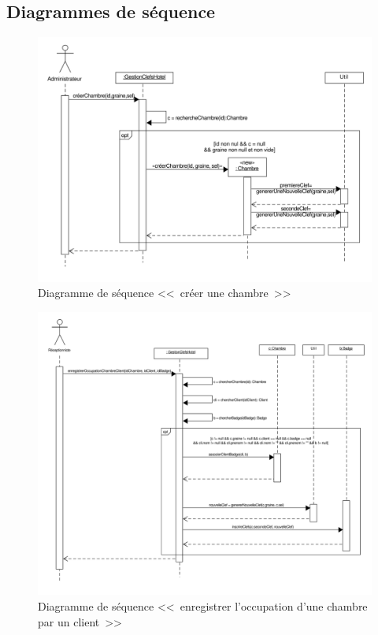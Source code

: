 \documentclass[11pt,article]{article}
\begin{document}
\newpage

\subsection{Diagrammes de séquence}

\begin{figure}[h!]
\begin{center}
\includegraphics[scale=0.4]{DiagrammesDeSequence/gestionclefshotel_uml_diag_seq_creer_chambre}
\caption{Diagramme de séquence <<~créer une chambre~>>}
\end{center}
\label{umlet_diag_classes}
\end{figure}

\begin{figure}[h!]
\begin{center}
\includegraphics[scale=0.3]{DiagrammesDeSequence/gestionclefshotel_uml_diag_seq_enregistrer_occupation_chambre_client}
\caption{Diagramme de séquence <<~enregistrer l'occupation d'une chambre par un client~>>}
\end{center}
\label{umlet_diag_classes}
\end{figure}
\end{document}
